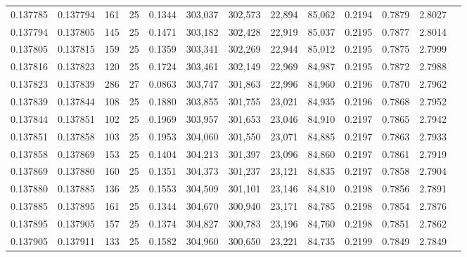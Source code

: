 \begin{tabular}{rrrrrrrrrrrrr}
0.137785 & 0.137794 &   161 &  25 &                                     0.1344 & 303,037 & 302,573 &  22,894 &  85,062 & 0.2194 & 0.7879 & 2.8027 \\
0.137794 & 0.137805 &   145 &  25 &                                     0.1471 & 303,182 & 302,428 &  22,919 &  85,037 & 0.2195 & 0.7877 & 2.8014 \\
0.137805 & 0.137815 &   159 &  25 &                                     0.1359 & 303,341 & 302,269 &  22,944 &  85,012 & 0.2195 & 0.7875 & 2.7999 \\
0.137816 & 0.137823 &   120 &  25 &                                     0.1724 & 303,461 & 302,149 &  22,969 &  84,987 & 0.2195 & 0.7872 & 2.7988 \\
0.137823 & 0.137839 &   286 &  27 &                                     0.0863 & 303,747 & 301,863 &  22,996 &  84,960 & 0.2196 & 0.7870 & 2.7962 \\
0.137839 & 0.137844 &   108 &  25 &                                     0.1880 & 303,855 & 301,755 &  23,021 &  84,935 & 0.2196 & 0.7868 & 2.7952 \\
0.137844 & 0.137851 &   102 &  25 &                                     0.1969 & 303,957 & 301,653 &  23,046 &  84,910 & 0.2197 & 0.7865 & 2.7942 \\
0.137851 & 0.137858 &   103 &  25 &                                     0.1953 & 304,060 & 301,550 &  23,071 &  84,885 & 0.2197 & 0.7863 & 2.7933 \\
0.137858 & 0.137869 &   153 &  25 &                                     0.1404 & 304,213 & 301,397 &  23,096 &  84,860 & 0.2197 & 0.7861 & 2.7919 \\
0.137869 & 0.137880 &   160 &  25 &                                     0.1351 & 304,373 & 301,237 &  23,121 &  84,835 & 0.2197 & 0.7858 & 2.7904 \\
0.137880 & 0.137885 &   136 &  25 &                                     0.1553 & 304,509 & 301,101 &  23,146 &  84,810 & 0.2198 & 0.7856 & 2.7891 \\
0.137885 & 0.137895 &   161 &  25 &                                     0.1344 & 304,670 & 300,940 &  23,171 &  84,785 & 0.2198 & 0.7854 & 2.7876 \\
0.137895 & 0.137905 &   157 &  25 &                                     0.1374 & 304,827 & 300,783 &  23,196 &  84,760 & 0.2198 & 0.7851 & 2.7862 \\
0.137905 & 0.137911 &   133 &  25 &                                     0.1582 & 304,960 & 300,650 &  23,221 &  84,735 & 0.2199 & 0.7849 & 2.7849 \\

\end{tabular}
